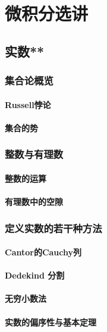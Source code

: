 \part{微积分选讲}
\chapter{实数**}
\section{集合论概览}
\subsection{Russell悖论}
\clearpage
\subsection{集合的势}
\clearpage


\section{整数与有理数}
\subsection{整数的运算}
\clearpage
\subsection{有理数中的空隙}
\clearpage


\section{定义实数的若干种方法}
\subsection{Cantor的Cauchy列}
\clearpage
\subsection{Dedekind 分割}
\clearpage
\subsection{无穷小数法}
\clearpage
\subsection{实数的偏序性与基本定理}
\clearpage

